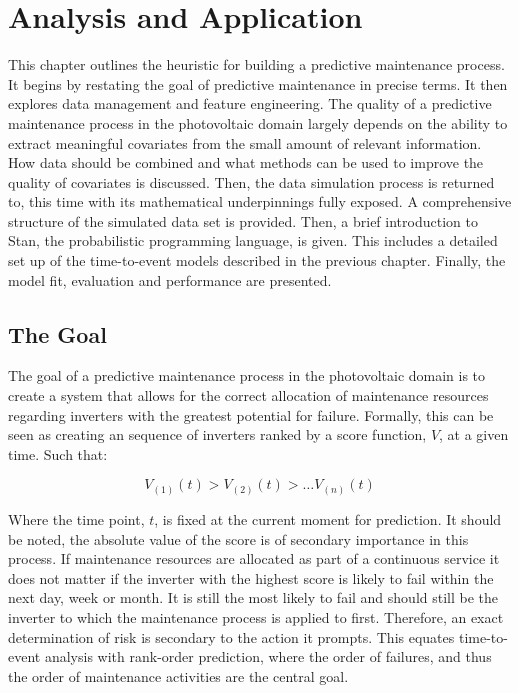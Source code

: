 \chapter*{Analysis and Application}
\thispagestyle{empty}



This chapter outlines the heuristic for building a predictive maintenance process. It begins by restating the goal of predictive maintenance in precise terms. It then explores data management and feature engineering. The quality of a predictive maintenance process in the photovoltaic domain largely depends on the ability to extract meaningful covariates from the small amount of relevant information. How data should be combined and what methods can be used to improve the quality of covariates is discussed. Then, the data simulation process is returned to, this time with its mathematical underpinnings fully exposed. A comprehensive structure of the simulated data set is provided. Then, a brief introduction to Stan, the probabilistic programming language, is given. This includes a detailed set up of the time-to-event models described in the previous chapter. Finally, the model fit, evaluation and performance are presented.

\section*{The Goal}


The goal of a predictive maintenance process in the photovoltaic domain is to create a system that allows for the correct allocation of maintenance resources regarding inverters with the greatest potential for failure. Formally, this can be seen as creating an sequence of inverters ranked by a score function, $V$, at a given time. Such that:

$$ V_{(1)}(t) > V_{(2)}(t) > \dots V_{(n)}(t) $$

Where the time point, $t$, is fixed at the current moment for prediction. It should be noted, the absolute value of the score is of secondary importance in this process. If maintenance resources are allocated as part of a continuous service it does not matter if the inverter with the highest score is likely to fail within the next day, week or month. It is still the most likely to fail and should still be the inverter to which the maintenance process is applied to first. Therefore, an exact determination of risk is secondary to the action it prompts. This equates time-to-event analysis with rank-order prediction, where the order of failures, and thus the order of maintenance activities are the central goal. 


